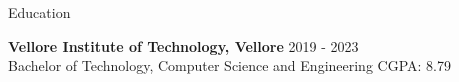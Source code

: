 \documentclass{resume}
\begin{document}
\begin{rSection}{Education}

\textbf{Vellore Institute of Technology, Vellore} \textbar{} 2019 - 2023 \\
Bachelor of Technology, Computer Science and Engineering \textbar{} CGPA: 8.79

\end{rSection}
\end{document}
